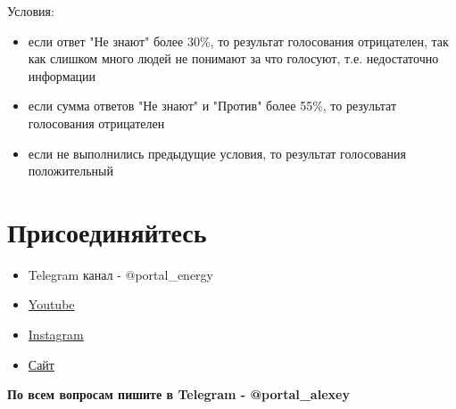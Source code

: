 \documentclass[a4paper,12pt]{report}
\begin{document}
Условия:
\begin{itemize}
	\item если ответ "Не знают" более 30\%, то результат голосования отрицателен, так как слишком много людей не понимают за что голосуют, т.е. недостаточно информации
	\item если сумма ответов "Не знают" и "Против" более 55\%, то результат голосования отрицателен
	\item если не выполнились предыдущие условия, то результат голосования положительный
\end{itemize}


\chapter{Присоединяйтесь}

\begin{itemize}
	\item Telegram канал - @portal\_energy
	\item \href{https://www.youtube.com/channel/UCtPxyCkz73i78F9HChlO61w}{Youtube}
	\item \href{https://www.instagram.com/petr_roadrunner/}{Instagram}
	\item \href{https://portalenergy.tech}{Сайт}
\end{itemize}

\textbf{По всем вопросам пишите в Telegram - @portal\_alexey}
\end{document}
